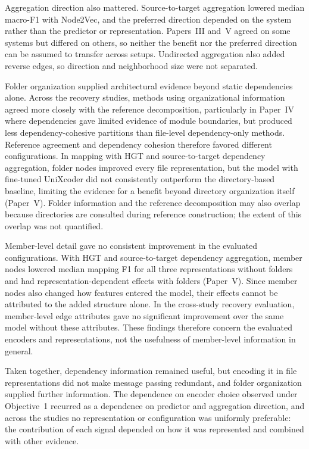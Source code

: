 Aggregation direction also mattered. Source-to-target aggregation lowered median macro-F1 with Node2Vec, and the preferred direction depended on the system rather than the predictor or representation. Papers~III and~V agreed on some systems but differed on others, so neither the benefit nor the preferred direction can be assumed to transfer across setups. Undirected aggregation also added reverse edges, so direction and neighborhood size were not separated.

Folder organization supplied architectural evidence beyond static dependencies alone. Across the recovery studies, methods using organizational information agreed more closely with the reference decomposition, particularly in Paper~IV where dependencies gave limited evidence of module boundaries, but produced less dependency-cohesive partitions than file-level dependency-only methods. Reference agreement and dependency cohesion therefore favored different configurations. In mapping with HGT and source-to-target dependency aggregation, folder nodes improved every file representation, but the model with fine-tuned UniXcoder did not consistently outperform the directory-based baseline, limiting the evidence for a benefit beyond directory organization itself (Paper~V). Folder information and the reference decomposition may also overlap because directories are consulted during reference construction; the extent of this overlap was not quantified.

Member-level detail gave no consistent improvement in the evaluated configurations. With HGT and source-to-target dependency aggregation, member nodes lowered median mapping F1 for all three representations without folders and had representation-dependent effects with folders (Paper~V). Since member nodes also changed how features entered the model, their effects cannot be attributed to the added structure alone. In the cross-study recovery evaluation, member-level edge attributes gave no significant improvement over the same model without these attributes. These findings therefore concern the evaluated encoders and representations, not the usefulness of member-level information in general.

Taken together, dependency information remained useful, but encoding it in file representations did not make message passing redundant, and folder organization supplied further information. The dependence on encoder choice observed under Objective~1 recurred as a dependence on predictor and aggregation direction, and across the studies no representation or configuration was uniformly preferable: the contribution of each signal depended on how it was represented and combined with other evidence.

